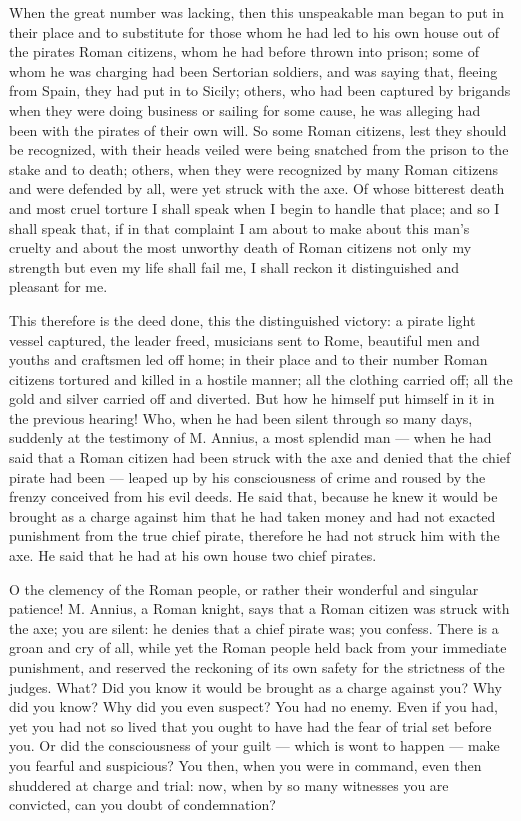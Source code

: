  When the great number was lacking, then this unspeakable man began to put in their place and to substitute for those whom he had led to his own house out of the pirates Roman citizens, whom he had before thrown into prison; some of whom he was charging had been Sertorian soldiers, and was saying that, fleeing from Spain, they had put in to Sicily; others, who had been captured by brigands when they were doing business or sailing for some cause, he was alleging had been with the pirates of their own will. So some Roman citizens, lest they should be recognized, with their heads veiled were being snatched from the prison to the stake and to death; others, when they were recognized by many Roman citizens and were defended by all, were yet struck with the axe. Of whose bitterest death and most cruel torture I shall speak when I begin to handle that place; and so I shall speak that, if in that complaint I am about to make about this man's cruelty and about the most unworthy death of Roman citizens not only my strength but even my life shall fail me, I shall reckon it distinguished and pleasant for me.

 This therefore is the deed done, this the distinguished victory: a pirate light vessel captured, the leader freed, musicians sent to Rome, beautiful men and youths and craftsmen led off home; in their place and to their number Roman citizens tortured and killed in a hostile manner; all the clothing carried off; all the gold and silver carried off and diverted. But how he himself put himself in it in the previous hearing! Who, when he had been silent through so many days, suddenly at the testimony of M. Annius, a most splendid man --- when he had said that a Roman citizen had been struck with the axe and denied that the chief pirate had been --- leaped up by his consciousness of crime and roused by the frenzy conceived from his evil deeds. He said that, because he knew it would be brought as a charge against him that he had taken money and had not exacted punishment from the true chief pirate, therefore he had not struck him with the axe. He said that he had at his own house two chief pirates.

 O the clemency of the Roman people, or rather their wonderful and singular patience! M. Annius, a Roman knight, says that a Roman citizen was struck with the axe; you are silent: he denies that a chief pirate was; you confess. There is a groan and cry of all, while yet the Roman people held back from your immediate punishment, and reserved the reckoning of its own safety for the strictness of the judges. What? Did you know it would be brought as a charge against you? Why did you know? Why did you even suspect? You had no enemy. Even if you had, yet you had not so lived that you ought to have had the fear of trial set before you. Or did the consciousness of your guilt --- which is wont to happen --- make you fearful and suspicious? You then, when you were in command, even then shuddered at charge and trial: now, when by so many witnesses you are convicted, can you doubt of condemnation?

